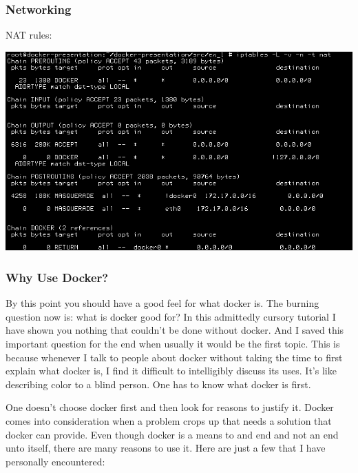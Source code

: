\documentclass[helvetica,english,utf8,notitle,nologo]{beamer}
\begin{document}
\begin{frame}
  \frametitle{Networking}

  NAT rules:

  \includegraphics[scale=0.44]{image_27}
\end{frame}

\begin{frame}
  \frametitle{Why Use Docker?}

  By this point you should have a good feel for what docker is. The
  burning question now is: what is docker good for? In this admittedly
  cursory tutorial I have shown you nothing that couldn't be done
  without docker. And I saved this important question for the end when
  usually it would be the first topic. This is because whenever I talk
  to people about docker without taking the time to first explain what
  docker is, I find it difficult to intelligibly discuss its
  uses. It's like describing color to a blind person. One has to know
  what docker is first.

  One doesn't choose docker first and then look for reasons to justify
  it. Docker comes into consideration when a problem crops up that
  needs a solution that docker can provide. Even though docker is a
  means to and end and not an end unto itself, there are many reasons
  to use it. Here are just a few that I have personally encountered:
\end{frame}
\end{document}
